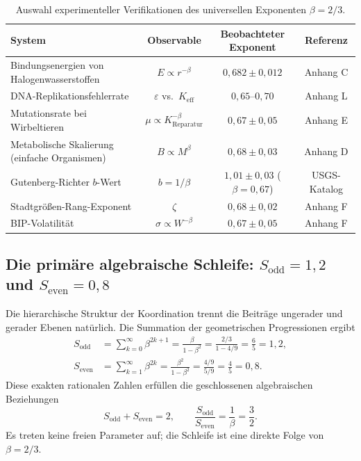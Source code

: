 \documentclass[12pt,a4paper]{article}
\begin{document}
	\begin{table}[htbp]
		\centering
		\caption{Auswahl experimenteller Verifikationen des universellen Exponenten \(\beta = 2/3\).}
		\label{tab:beta-evidence}
		\small
		\begin{tabular}{l c c c}
			\toprule
			System & Observable & Beobachteter Exponent & Referenz \\
			\midrule
			Bindungsenergien von Halogenwasserstoffen & \(E \propto r^{-\beta}\) & \(0,682 \pm 0,012\) & Anhang C \\
			DNA-Replikationsfehlerrate & \(\varepsilon\) vs.\ \(K_{\mathrm{eff}}\) & \(0,65\text{--}0,70\) & Anhang L \\
			Mutationsrate bei Wirbeltieren & \(\mu \propto K_{\mathrm{Reparatur}}^{-\beta}\) & \(0,67 \pm 0,05\) & Anhang E \\
			Metabolische Skalierung (einfache Organismen) & \(B \propto M^{\beta}\) & \(0,68 \pm 0,03\) & Anhang D \\
			Gutenberg-Richter \(b\)-Wert & \(b = 1/\beta\) & \(1,01 \pm 0,03\) (\(\beta=0,67\)) & USGS-Katalog \\
			Stadtgrößen-Rang-Exponent & \(\zeta\) & \(0,68 \pm 0,02\) & Anhang F \\
			BIP-Volatilität & \(\sigma \propto W^{-\beta}\) & \(0,67 \pm 0,05\) & Anhang F \\
			\bottomrule
		\end{tabular}
	\end{table}
	
	\subsection{Die primäre algebraische Schleife: \(S_{\mathrm{odd}} = 1,2\) und \(S_{\mathrm{even}} = 0,8\)}
	\label{sec:algebraic-loop}
	
	Die hierarchische Struktur der Koordination trennt die Beiträge ungerader und gerader Ebenen natürlich. Die Summation der geometrischen Progressionen ergibt
	\begin{align}
		S_{\mathrm{odd}} &= \sum_{k=0}^{\infty} \beta^{2k+1} = \frac{\beta}{1-\beta^{2}} = \frac{2/3}{1 - 4/9} = \frac{6}{5} = 1,2, \label{eq:sodd}\\
		S_{\mathrm{even}} &= \sum_{k=1}^{\infty} \beta^{2k} = \frac{\beta^{2}}{1-\beta^{2}} = \frac{4/9}{5/9} = \frac{4}{5} = 0,8. \label{eq:seven}
	\end{align}
	Diese exakten rationalen Zahlen erfüllen die geschlossenen algebraischen Beziehungen
	\begin{equation}
		\boxed{S_{\mathrm{odd}} + S_{\mathrm{even}} = 2, \qquad \frac{S_{\mathrm{odd}}}{S_{\mathrm{even}}} = \frac{1}{\beta} = \frac{3}{2}}.
		\label{eq:algebraic-loop}
	\end{equation}
	Es treten keine freien Parameter auf; die Schleife ist eine direkte Folge von \(\beta = 2/3\).
	
\end{document}
